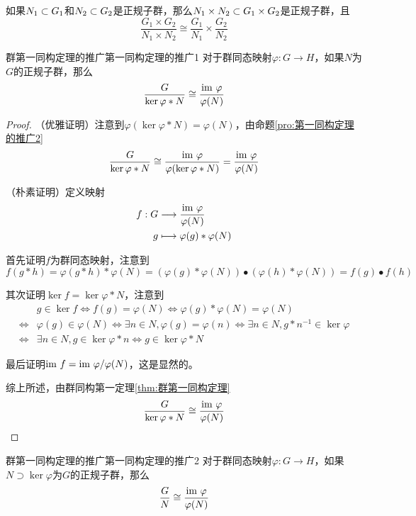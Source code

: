 \begin{corollary}
	如果$N_1\subset G_1$和$N_2\subset G_2$是正规子群，那么$N_1\times N_2\subset G_1\times G_2$是正规子群，且
	$$
	\frac{G_1\times G_2}{N_1\times N_2}\cong\frac{G_1}{N_1}\times\frac{G_2}{N_2}
	$$
\end{corollary}

\begin{proposition}{群第一同构定理的推广}{第一同构定理的推广1}
	对于群同态映射$\varphi:G\to H$，如果$N$为$G$的正规子群，那么
	$$
	\frac{G}{\ker\varphi*N}\cong\frac{\text{im } \varphi}{\varphi(N)}
	$$
\end{proposition}

\begin{proof}
	（优雅证明）注意到$\varphi(\ker\varphi*N)=\varphi(N)$，由命题\ref{pro:第一同构定理的推广2}
	$$
	\frac{G}{\ker\varphi*N}\cong\frac{\text{im } \varphi}{\varphi(\ker\varphi*N)}=\frac{\text{im } \varphi}{\varphi(N)}
	$$
	
	（朴素证明）定义映射
	\begin{align*}
		f:\begin{aligned}[t]
			G&\longrightarrow \frac{\text{im } \varphi}{\varphi(N)}\\
			g&\longmapsto \varphi(g)*\varphi(N)
		\end{aligned}
	\end{align*}
	
	首先证明$f$为群同态映射，注意到
	$$
	f(g*h)=\varphi(g*h)*\varphi(N)=(\varphi(g)*\varphi(N))\bullet(\varphi(h)*\varphi(N))=f(g)\bullet f(h)
	$$
	
	其次证明$\ker f=\ker\varphi*N$，注意到
	\begin{align*}
		&g\in\ker f
		\iff f(g)=\varphi(N)
		\iff \varphi(g)*\varphi(N)=\varphi(N)\\
		\iff &\varphi(g)\in\varphi(N)
		\iff \exists n\in N,\varphi(g)=\varphi(n)
		\iff \exists n\in N,g*n^{-1}\in\ker\varphi\\
		\iff&\exists n\in N,g\in\ker\varphi*n
		\iff g\in\ker\varphi*N
	\end{align*}
	
	最后证明$\text{im } f=\text{im } \varphi/\varphi(N)$，这是显然的。
	
	综上所述，由群同构第一定理\ref{thm:群第一同构定理}
	$$
	\frac{G}{\ker\varphi*N}\cong\frac{\text{im } \varphi}{\varphi(N)}
	$$
\end{proof}

\begin{proposition}{群第一同构定理的推广}{第一同构定理的推广2}
	对于群同态映射$\varphi:G\to H$，如果$N\supset\ker\varphi$为$G$的正规子群，那么
	$$
	\frac{G}{N}\cong\frac{\text{im } \varphi}{\varphi(N)}
	$$
\end{proposition}

